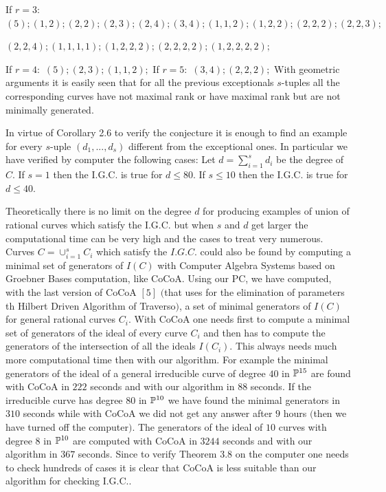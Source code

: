If $r=3:$
$(5); (1,2); (2,2); (2,3); (2,4); (3,4); (1,1,2); (1,2,2); (2,2,2);
(2,2,3);$

$(2,2,4); (1,1,1,1); (1,2,2,2); (2,2,2,2);(1,2,2,2,2);$ \medskip

If $r=4:$
 $(5); (2,3); (1,1,2);$
\medskip
If $r=5:$
$(3,4); (2,2,2);$\medskip 
 \endproclaim
{} With geometric arguments it is easily seen that for
all the 
previous
exceptionals $s$-tuples all the corresponding curves have not maximal rank
or
have maximal rank but are not minimally generated.\endproclaim

In virtue of Corollary 2.6 to verify the conjecture it is enough to find
an example
for every $s$-uple $(d_1,...,d_s)$ different from the exceptional ones.
In particular we have verified by computer the following cases:
 Let $d=\sum_{i=1}^s d_i$ be the degree of $C$. If
$s=1$  then the I.G.C. is true for 
 $d\leq 80$. If $s\leq 10$  then the I.G.C. is true for 
 $d\leq 40$.\endproclaim

 Theoretically there is no limit on the degree $d$
for  producing examples of union of rational curves
which satisfy the I.G.C. but when $s$ and $d$ get larger the computational
time can be very 
high and the cases to treat very numerous.\endproclaim
{} Curves $C=\cup_{i=1}^s  C_i$  which satisfy the
$I.G.C.$  could also be 
found by computing  a minimal set of generators of $I(C)$ 
with Computer Algebra Systems based on Groebner Bases computation, like
CoCoA. 
Using our PC, we  have computed,
 with the last version of CoCoA $[5]$ $($that uses for the elimination of
parameters
th Hilbert Driven Algorithm of Traverso$)$,
 a set of minimal generators of  $I(C)$ for general rational curves
$C_i$.
With CoCoA one needs first to compute a minimal set of generators of the
ideal
of every curve $C_i$ and then has to compute the generators of the
intersection of all the 
ideals $I(C_i)$. This  always needs much more computational time then with
our algorithm.
For example the minimal generators of the ideal of a general
 irreducible curve of degree $40$ in 
$\Bbb P^{15}$ are found with CoCoA in  $222$ 
 seconds and with our algorithm in $88$ seconds. 
If the irreducible curve has degree $80$ in $\Bbb P^{10}$ we have found
the 
minimal generators in  $310$ seconds while with CoCoA we did not get any
answer after
$9$ hours $($then we have turned off the computer$)$. 
The generators  of 
the ideal of $10$
curves with degree $8$ in $\Bbb P^{10}$ are computed with CoCoA in $3244$
seconds and
with our algorithm in $367$ seconds. Since to verify
 Theorem $3.8$
on the computer one needs to check hundreds of cases 
it is clear that CoCoA
 is less  suitable than our algorithm for checking I.G.C..
\endproclaim


